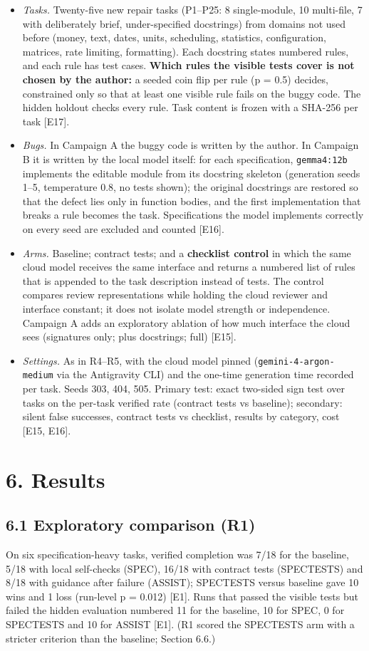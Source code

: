 \documentclass[11pt]{article}
\newcommand{\code}[1]{\texttt{#1}}
\begin{document}
\begin{itemize}
\item \emph{Tasks.} Twenty-five new repair tasks (P1–P25: 8 single-module, 10 multi-file, 7 with deliberately brief, under-specified docstrings) from domains not used before (money, text, dates, units, scheduling, statistics, configuration, matrices, rate limiting, formatting). Each docstring states numbered rules, and each rule has test cases. \textbf{Which rules the visible tests cover is not chosen by the author:} a seeded coin flip per rule (p = 0.5) decides, constrained only so that at least one visible rule fails on the buggy code. The hidden holdout checks every rule. Task content is frozen with a SHA-256 per task [E17].
\item \emph{Bugs.} In Campaign A the buggy code is written by the author. In Campaign B it is written by the local model itself: for each specification, \code{gemma4:12b} implements the editable module from its docstring skeleton (generation seeds 1–5, temperature 0.8, no tests shown); the original docstrings are restored so that the defect lies only in function bodies, and the first implementation that breaks a rule becomes the task. Specifications the model implements correctly on every seed are excluded and counted [E16].
\item \emph{Arms.} Baseline; contract tests; and a \textbf{checklist control} in which the same cloud model receives the same interface and returns a numbered list of rules that is appended to the task description instead of tests. The control compares review representations while holding the cloud reviewer and interface constant; it does not isolate model strength or independence. Campaign A adds an exploratory ablation of how much interface the cloud sees (signatures only; plus docstrings; full) [E15].
\item \emph{Settings.} As in R4–R5, with the cloud model pinned (\code{gemini-\allowbreak{}4-\allowbreak{}argon-\allowbreak{}medium} via the Antigravity CLI) and the one-time generation time recorded per task. Seeds 303, 404, 505. Primary test: exact two-sided sign test over tasks on the per-task verified rate (contract tests vs baseline); secondary: silent false successes, contract tests vs checklist, results by category, cost [E15, E16].
\end{itemize}
\section*{6. Results}
\subsection*{6.1 Exploratory comparison (R1)}
On six specification-heavy tasks, verified completion was 7/18 for the baseline, 5/18 with local self-checks (SPEC), 16/18 with contract tests (SPECTESTS) and 8/18 with guidance after failure (ASSIST); SPECTESTS versus baseline gave 10 wins and 1 loss (run-level p = 0.012) [E1]. Runs that passed the visible tests but failed the hidden evaluation numbered 11 for the baseline, 10 for SPEC, 0 for SPECTESTS and 10 for ASSIST [E1]. (R1 scored the SPECTESTS arm with a stricter criterion than the baseline; Section 6.6.)
\end{document}

